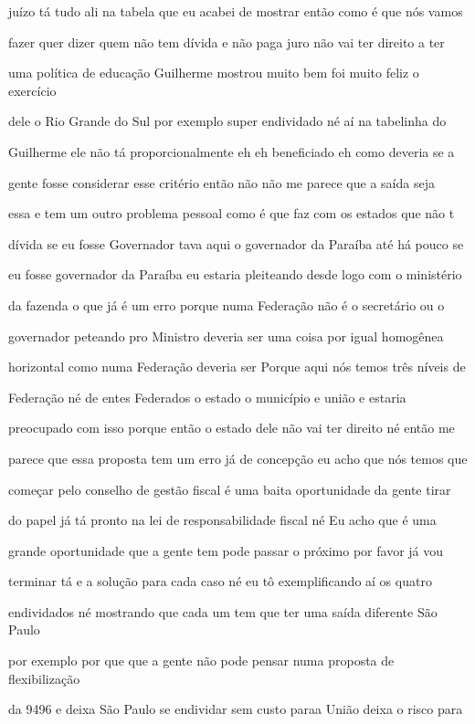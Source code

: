 \documentclass[a4paper,12pt]{article}
\begin{document}
juízo tá tudo ali na tabela que eu acabei de mostrar então como é que nós vamos

fazer quer dizer quem não tem dívida e não paga juro não vai ter direito a ter

uma política de educação Guilherme mostrou muito bem foi muito feliz o exercício

dele o Rio Grande do Sul por exemplo super endividado né aí na tabelinha do

Guilherme ele não tá proporcionalmente eh eh beneficiado eh como deveria se a

gente fosse considerar esse critério então não não me parece que a saída seja

essa e tem um outro problema pessoal como é que faz com os estados que não t

dívida se eu fosse Governador tava aqui o governador da Paraíba até há pouco se

eu fosse governador da Paraíba eu estaria pleiteando desde logo com o ministério

da fazenda o que já é um erro porque numa Federação não é o secretário ou o

governador peteando pro Ministro deveria ser uma coisa por igual homogênea

horizontal como numa Federação deveria ser Porque aqui nós temos três níveis de

Federação né de entes Federados o estado o município e união e estaria

preocupado com isso porque então o estado dele não vai ter direito né então me

parece que essa proposta tem um erro já de concepção eu acho que nós temos que

começar pelo conselho de gestão fiscal é uma baita oportunidade da gente tirar

do papel já tá pronto na lei de responsabilidade fiscal né Eu acho que é uma

grande oportunidade que a gente tem pode passar o próximo por favor já vou

terminar tá e a solução para cada caso né eu tô exemplificando aí os quatro

endividados né mostrando que cada um tem que ter uma saída diferente São Paulo

por exemplo por que que a gente não pode pensar numa proposta de flexibilização

da 9496 e deixa São Paulo se endividar sem custo paraa União deixa o risco para
\end{document}
